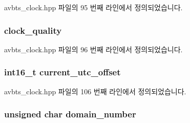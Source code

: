 avbts\+\_\+clock.\+hpp 파일의 95 번째 라인에서 정의되었습니다.

\subsubsection[{\texorpdfstring{clock\+\_\+quality}{clock_quality}}]{ clock\+\_\+quality\hspace{0.3cm}{\ttfamily [private]}}\hypertarget{class_i_e_e_e1588_clock_aca3c1cfd540c15574df0890efc980cbe}{}\label{class_i_e_e_e1588_clock_aca3c1cfd540c15574df0890efc980cbe}


avbts\+\_\+clock.\+hpp 파일의 96 번째 라인에서 정의되었습니다.

\subsubsection[{\texorpdfstring{current\+\_\+utc\+\_\+offset}{current_utc_offset}}]{\setlength{\rightskip}{0pt plus 5cm}int16\+\_\+t current\+\_\+utc\+\_\+offset\hspace{0.3cm}{\ttfamily [private]}}\hypertarget{class_i_e_e_e1588_clock_a01afaec5cd4deeb3a2ffb210ef83d50f}{}\label{class_i_e_e_e1588_clock_a01afaec5cd4deeb3a2ffb210ef83d50f}


avbts\+\_\+clock.\+hpp 파일의 106 번째 라인에서 정의되었습니다.

\subsubsection[{\texorpdfstring{domain\+\_\+number}{domain_number}}]{\setlength{\rightskip}{0pt plus 5cm}unsigned char domain\+\_\+number\hspace{0.3cm}{\ttfamily [private]}}\hypertarget{class_i_e_e_e1588_clock_a7a6e97f0620fb70776c613bdbd0763d8}{}\label{class_i_e_e_e1588_clock_a7a6e97f0620fb70776c613bdbd0763d8}


